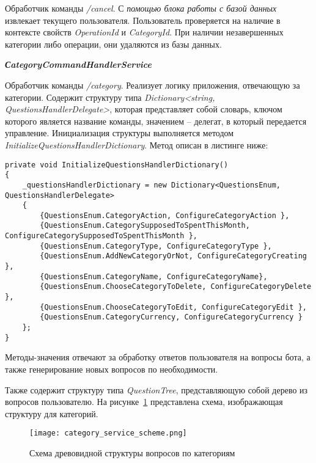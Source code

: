 Обработчик команды \emph{/cancel}. С \emph{помощью блока работы с базой данных} извлекает текущего пользователя. Пользователь проверяется на наличие в контексте свойств \emph{OperationId} и \emph{CategoryId}. При наличии незавершенных категории либо операции, они удаляются из базы данных.

\textbf{\emph{СategoryCommandHandlerService}}

Обработчик команды \emph{/category}. Реализует логику приложения, отвечающую за категории. Содержит структуру типа \emph{Dictionary<string, \linebreak QuestionsHandlerDelegate>}, которая представляет собой словарь, ключом которого является название команды, значением – делегат, в который передается управление.
Инициализация структуры выполняется методом \linebreak \emph{InitializeQuestionsHandlerDictionary}. Метод описан в листинге ниже:

\lstset{style=sharpc}
\begin{lstlisting}
private void InitializeQuestionsHandlerDictionary()
{
	_questionsHandlerDictionary = new Dictionary<QuestionsEnum, QuestionsHandlerDelegate>
	{
		{QuestionsEnum.CategoryAction, ConfigureCategoryAction },
		{QuestionsEnum.CategorySupposedToSpentThisMonth, ConfigureCategorySupposedToSpentThisMonth },
		{QuestionsEnum.CategoryType, ConfigureCategoryType },
		{QuestionsEnum.AddNewCategoryOrNot, ConfigureCategoryCreating },
		{QuestionsEnum.CategoryName, ConfigureCategoryName},
		{QuestionsEnum.ChooseCategoryToDelete, ConfigureCategoryDelete },
		{QuestionsEnum.ChooseCategoryToEdit, ConfigureCategoryEdit },
		{QuestionsEnum.CategoryCurrency, ConfigureCategoryCurrency }
	};
}
\end{lstlisting}

Методы-значения отвечают за обработку ответов пользователя на вопросы бота, а также генерирование новых вопросов по необходимости.

Также содержит структуру типа \emph{QuestionTree}, представляющую собой дерево из вопросов пользователю. На рисунке~\ref{fig:design:server:category_service_scheme} представлена схема, изображающая структуру для категорий.

\begin{figure}[!h]
\centering
	\texttt{[image: category\_service\_scheme.png]}
	\caption{Схема древовидной структуры вопросов по категориям}
	\label{fig:design:server:category_service_scheme}
\end{figure}

